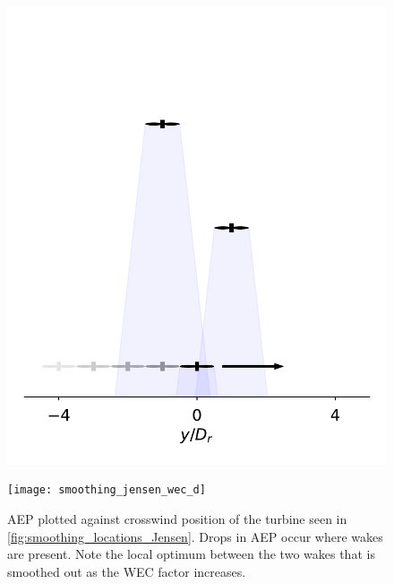 \documentclass[a4paper]{jpconf}
\begin{document}
\begin{figure}[ht]
	\centering
	\begin{minipage}[t]{0.43\textwidth}
		\centering
		\includegraphics[width=\textwidth, trim={-0.5cm -0.5cm -0.5cm 3.25cm}, clip]{final_images/layouts/3turb-design-space}
		\caption{Simple wind farm, seen from above, used to demonstrate the effects of the wake spreading angle relaxation factor, $\xi$, on the wind farm layout design space (see \cref{fig:JensenLocalOptSmoothed}). Wind is from the top.}
		\label{fig:smoothing_locations_Jensen}
	\end{minipage}\hspace{1pc}
	\begin{minipage}[t]{0.52\textwidth}
		\centering
		\texttt{[image: smoothing\_jensen\_wec\_d]}
		\caption{AEP plotted against crosswind position of the turbine seen in \cref{fig:smoothing_locations_Jensen}. Drops in AEP occur where wakes are present. Note the local optimum between the two wakes that is smoothed out as the WEC factor increases.}
		\label{fig:JensenLocalOptSmoothed}
	\end{minipage}
\end{figure}
\end{document}
